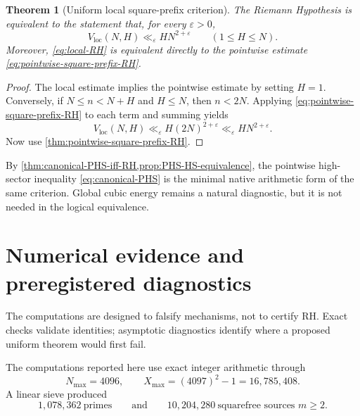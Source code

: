 \documentclass[11pt]{article}
\newtheorem{theorem}{Theorem}[section]
\theoremstyle{definition}
\newcommand{\eps}{\varepsilon}
\newcommand{\1}{\mathbf{1}}
\begin{document}
\begin{theorem}[Uniform local square-prefix criterion]
\label{thm:local-RH}
The Riemann Hypothesis is equivalent to the statement that, for every $\eps>0$,
\begin{equation}
 V_{\mathrm{loc}}(N,H)
 \ll_\eps HN^{2+\eps}
 \qquad(1\le H\le N).
 \label{eq:local-RH}
\end{equation}
Moreover, \cref{eq:local-RH} is equivalent directly to the pointwise estimate \cref{eq:pointwise-square-prefix-RH}.
\end{theorem}

\begin{proof}
The local estimate implies the pointwise estimate by setting $H=1$.  Conversely, if $N\le n<N+H$ and $H\le N$, then $n<2N$.  Applying \cref{eq:pointwise-square-prefix-RH} to each term and summing yields
\[
 V_{\mathrm{loc}}(N,H)
 \ll_\eps H(2N)^{2+\eps}
 \ll_\eps HN^{2+\eps}.
\]
Now use \cref{thm:pointwise-square-prefix-RH}.
\end{proof}

By \cref{thm:canonical-PHS-iff-RH,prop:PHS-HS-equivalence}, the pointwise high-sector inequality \cref{eq:canonical-PHS} is the minimal native arithmetic form of the same criterion.  Global cubic energy remains a natural diagnostic, but it is not needed in the logical equivalence.


\section{Numerical evidence and preregistered diagnostics}
\label{sec:numerics}

The computations are designed to falsify mechanisms, not to certify RH.  Exact checks validate identities; asymptotic diagnostics identify where a proposed uniform theorem would first fail.

The computations reported here use exact integer arithmetic through
\begin{equation}
 N_{\max}=4096,
 \qquad
 X_{\max}=(4097)^2-1=16{,}785{,}408.
 \label{eq:numerical-range}
\end{equation}
A linear sieve produced
\begin{equation}
 1{,}078{,}362\ \text{primes}
 \qquad\text{and}\qquad
 10{,}204{,}280\ \text{squarefree sources }m\ge2.
 \label{eq:numerical-counts}
\end{equation}
\end{document}
